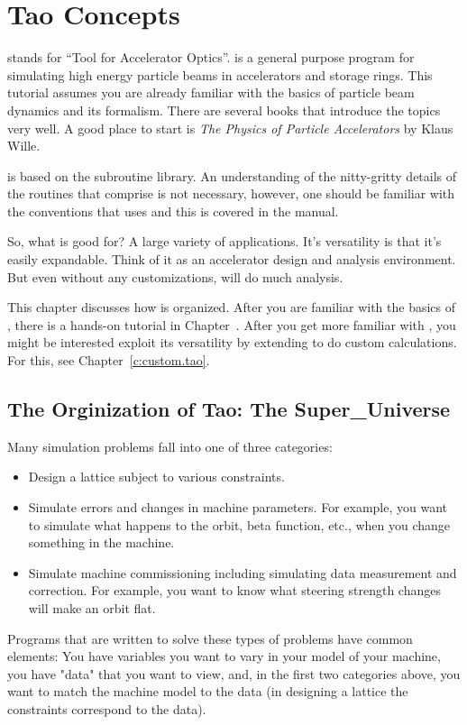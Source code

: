 \chapter{Tao Concepts}
\label{c:concepts}

\tao stands for ``Tool for Accelerator Optics''. \tao is a general
purpose program for simulating high energy particle beams in
accelerators and storage rings. This tutorial assumes you are already
familiar with the basics of particle beam dynamics and its
formalism. There are several books that introduce the topics very
well. A good place to start is \textit{The Physics of Particle
Accelerators} by Klaus Wille.

\tao is based on the \bmad\cite{b:bmad} subroutine library. An
understanding of the nitty-gritty details of the routines that
comprise \bmad is not necessary, however, one should be familiar with
the conventions that \bmad uses and this is covered in the \bmad
manual.

So, what is \tao good for? A large variety of applications. It's
versatility is that it's easily expandable. Think of it as an
accelerator design and analysis environment. But even without any
customizations, \tao will do much analysis. 

This chapter discusses how \tao is organized. After you are familiar
with the basics of \tao, there is a hands-on tutorial in
Chapter~. After you get more familiar with \tao, you
might be interested exploit its versatility by extending \tao to do
custom calculations. For this, see Chapter~\ref{c:custom.tao}.

\section{The Orginization of Tao: The Super\_Universe}
\label{s:orginization}

Many simulation problems fall into one of three categories: 
\begin{itemize}
\item 
Design a lattice subject to various constraints.
\item
Simulate errors and changes in machine parameters. For example, you want to
simulate what happens to the orbit, beta function, etc., when you change
something in the machine. 
\item 
Simulate machine commissioning including simulating data measurement and
correction. For example, you want to know what steering strength changes will
make an orbit flat.
\end{itemize}
Programs that are written to solve these types of problems have common
elements: You have variables you want to vary in your model of your
machine, you have "data" that you want to view, and, in the first two
categories above, you want to match the machine model to the data (in
designing a lattice the constraints correspond to the data).

